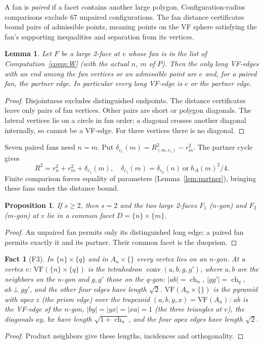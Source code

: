 \documentclass[11pt]{article}
\newtheorem{lemma}[theorem]{Lemma}
\newtheorem{proposition}[theorem]{Proposition}
\newtheorem{fact}[theorem]{Fact}
\theoremstyle{definition}
\theoremstyle{remark}
\newcommand{\VF}{\mathrm{VF}}
\newcommand{\conv}{\operatorname{conv}}
\newcommand{\ch}{\operatorname{ch}}
\begin{document}
A fan is \emph{paired} if a facet contains another large polygon.
Configuration-radius comparisons exclude 67 unpaired configurations.
The fan distance certificates bound pairs of admissible points, meaning
points on the VF sphere satisfying the fan's supporting inequalities
and separation from its vertices.

\begin{lemma}\label{lem:Wuse}
Let $F$ be a large 2-face at $v$ whose fan is in the list of
Computation~\ref{comp:W} (with the actual $n$, $m$ of $P$). Then the only
long VF-edges with an end among the fan vertices or an admissible point
are $e$ and, for a paired fan, the partner edge. In particular every long
VF-edge is $e$ or the partner edge.
\end{lemma}
\begin{proof}
Disjointness excludes distinguished endpoints.
The distance certificates leave only pairs of fan vertices.
Other pairs are short or polygon diagonals. The lateral vertices lie on
a circle in fan order; a diagonal crosses another diagonal internally,
so cannot be a VF-edge. For three vertices there is no diagonal.
\end{proof}

Seven paired fans need $n=m$. Put
$\delta_{c_1}(m)=R_{(m,c_1)}^2-r_m^2$.
The partner cycle gives
\[
 R^2=r_n^2+r_m^2+\delta_{c_1}(m),\quad
 \delta_{c_1}(m)=\delta_{c_2}(n)\ \text{or}\ h_A(m)^2/4.
\]
Finite comparison forces equality of parameters
(Lemma~\ref{lem:partner}), bringing these fans under the distance bound.
\begin{proposition}\label{prop:reduction}
If $s\ge2$, then $s=2$ and the two large 2-faces $F_1$ ($n$-gon) and $F_2$
($m$-gon) at $v$ lie in a common facet $D=\{n\}\times\{m\}$.
\end{proposition}
\begin{proof}
An unpaired fan permits only its distinguished long edge; a paired fan
permits exactly it and its partner. Their common facet is the duoprism.
\end{proof}

\begin{fact}[F3]\label{fact:F3}
In $\{n\}\times\{q\}$ and in $A_n\times\{\}$ every vertex lies on an
$n$-gon. At a vertex $v$:
$\VF(\{n\}\times\{q\})$ is the tetrahedron $\conv(a,b,g,g')$, where $a,b$
are the neighbors on the $n$-gon and $g,g'$ those on the $q$-gon:
$|ab|=\ch_n$, $|gg'|=\ch_q$, $ab\perp gg'$, and the other four edges have
length $\sqrt2$. $\VF(A_n\times\{\})$ is the pyramid with apex $z$ (the
prism edge) over the trapezoid $(a,b,y,x)=\VF(A_n)$: $ab$ is the VF-edge of
the $n$-gon, $|by|=|yx|=|xa|=1$ (the three triangles at $v$), the diagonals
$ay$, $bx$ have length $\sqrt{1+\ch_n}$, and the four apex edges have
length $\sqrt2$.
\end{fact}
\begin{proof}Product neighbors give these lengths, incidences and orthogonality.\end{proof}
\end{document}
